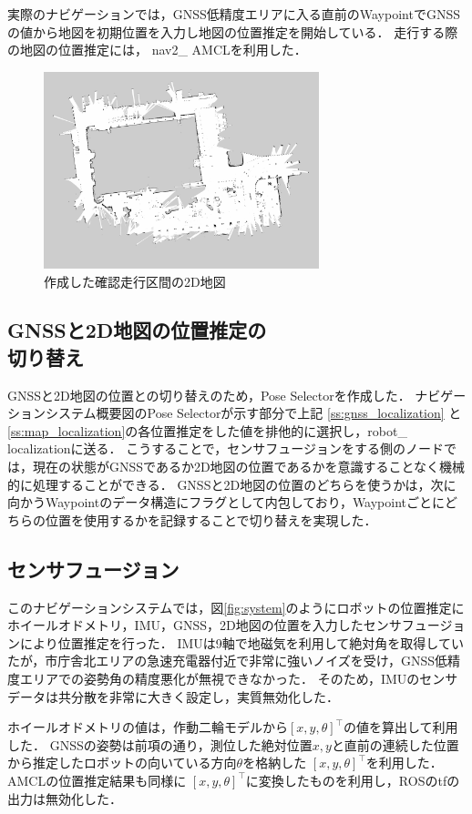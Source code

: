 \documentclass[platex,dvipdfmx]{rbproceedings}
\begin{document}
実際のナビゲーションでは，GNSS低精度エリアに入る直前のWaypointでGNSSの値から地図を初期位置を入力し地図の位置推定を開始している．
走行する際の地図の位置推定には， nav2\_ AMCL\cite{nav2}を利用した．
\begin{figure}[htbp]
    \centering   
    \includegraphics[keepaspectratio,width=80mm]{fig/map.png}
    \caption{作成した確認走行区間の2D地図}
    \label{fig:map}
\end{figure}

\subsection{GNSSと2D地図の位置推定の\\切り替え}
GNSSと2D地図の位置との切り替えのため，Pose Selectorを作成した．
ナビゲーションシステム概要図のPose Selectorが示す部分で上記 \ref{ss:gnss_localization} と  \ref{ss:map_localization}の各位置推定をした値を排他的に選択し，robot\_ localizationに送る．
こうすることで，センサフュージョンをする側のノードでは，現在の状態がGNSSであるか2D地図の位置であるかを意識することなく機械的に処理することができる．
GNSSと2D地図の位置のどちらを使うかは，次に向かうWaypointのデータ構造にフラグとして内包しており，Waypointごとにどちらの位置を使用するかを記録することで切り替えを実現した．


\subsection{センサフュージョン}\label{ss:sensor_fusion}
このナビゲーションシステムでは，図\ref{fig:system}のようにロボットの位置推定にホイールオドメトリ，IMU，GNSS，2D地図の位置を入力したセンサフュージョンにより位置推定を行った．
IMUは9軸で地磁気を利用して絶対角を取得していたが，市庁舎北エリアの急速充電器付近で非常に強いノイズを受け，GNSS低精度エリアでの姿勢角の精度悪化が無視できなかった．
そのため，IMUのセンサデータは共分散を非常に大きく設定し，実質無効化した．

ホイールオドメトリの値は，作動二輪モデルから$\left[ x, y, \theta \right] ^\top$の値を算出して利用した．
GNSSの姿勢は前項の通り，測位した絶対位置$x, y$と直前の連続した位置から推定したロボットの向いている方向$\theta$を格納した $\left[ x, y, \theta \right] ^\top$を利用した．
AMCLの位置推定結果も同様に $\left[ x, y, \theta \right] ^\top$に変換したものを利用し，ROSのtfの出力は無効化した．
\end{document}
